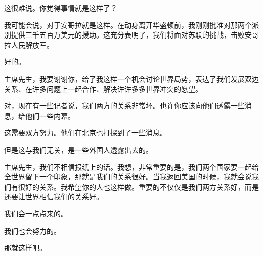 这很难说。你觉得事情就是这样了？

我可能会说，对于安哥拉就是这样。在动身离开华盛顿前，我刚刚批准对那两个派别提供三千五百万美元的援助。这充分表明了，我们将面对苏联的挑战，击败安哥拉人民解放军。

好的。

主席先生，我要谢谢你，给了我这样一个机会讨论世界局势，表达了我们发展双边关系、在许多问题上一起合作、解决许许多多世界冲突的愿望。

对，现在有一些记者说，我们两方的关系非常坏。也许你应该向他们透露一些消息，给他们一些内幕。

这需要双方努力。他们在北京也打探到了一些消息。

但是这与我们无关，是一些外国人透露出去的。

主席先生，我们不相信报纸上的话。我想，非常重要的是，我们两个国家要一起给全世界留下一个印象，那就是我们的关系很好。当我返回美国的时候，我就会说我们有很好的关系。我希望你的人也这样做。重要的不仅仅是我们两方关系好，而是还要让世界相信我们的关系好。

我们会一点点来的。

我们也会努力的。

那就这样吧。

